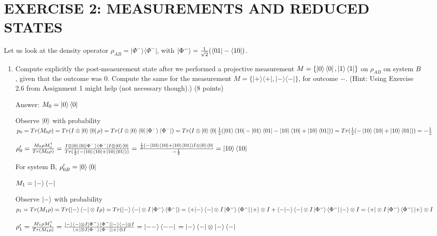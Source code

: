 \documentclass{article}
\begin{document}
\section{EXERCISE 2: MEASUREMENTS AND REDUCED STATES}
Let us look at the density operator $\rho_{AB} = |\Phi^{-}\rangle\langle\Phi^{-}|$, with $|\Phi^{-}\rangle = \frac{1}{\sqrt{2}}(\bra{01} - \bra{10})$.

\begin{enumerate}
    \item Compute explicitly the post-measurement state after we performed a projective measurement $M = \{\ket{0}\bra{0},\ket{1}\bra{1}\}$ on $\rho_{AB}$ on system $B$, given that the outcome was $0$. Compute the same for the measurement $M = \{|+\rangle\langle+|, |-\rangle\langle-|\}$, for outcome $-$. (Hint: Using Exercise 2.6 from Assignment 1 might help (not necessary though).) (8 points)

          Answer: $M_0=\ket{0}\bra{0}$

          Observe $\ket{0}$ with probability $p_0=Tr(M_0\rho)=Tr(I\otimes \ket{0}\bra{0}\rho)=Tr(I\otimes \ket{0}\bra{0}\ket{\Phi^{-}}\bra{\Phi^{-}})=Tr(I\otimes \ket{0}\bra{0}\frac{1}{2}(\ket{01}\bra{10}-\ket{01}\bra{01}-\ket{10}\bra{10}+\ket{10}\bra{01}))=Tr(\frac{1}{2}(-\ket{10}\bra{10}+\ket{10}\bra{01}))=-\frac{1}{2}$

          $\rho_0'=\frac{M_0\rho M_0^{\dagger}}{Tr(M_0\rho)}
              \\=\frac{I\otimes \ket{0}\bra{0}\ket{\Phi^{-}}\bra{\Phi^{-}}I\otimes \ket{0}\bra{0}}{Tr(\frac{1}{2}(-\ket{10}\bra{10}+\ket{10}\bra{01}))}
              \\=\frac{\frac{1}{2}(-\ket{10}\bra{10}+\ket{10}\bra{01})I\otimes \ket{0}\bra{0}}{-\frac{1}{2}}
              \\=\ket{10}\bra{10}
          $

          For system B, $\rho_{0B}'=\ket{0}\bra{0}$


          $M_1=\ket{-}\bra{-}$

          Observe $\ket{-}$ with probability $p_1=Tr(M_1\rho)=Tr(\ket{-}\bra{-}\otimes I\rho)=Tr(\ket{-}\bra{-}\otimes I\ket{\Phi^{-}}\bra{\Phi^{-}})=\braket{+|-}\bra{-}\otimes I\ket{\Phi^-}\bra{\Phi^-}\ket{+}\otimes I+\braket{-|-}\bra{-}\otimes I\ket{\Phi^-}\bra{\Phi^-}\ket{-}\otimes I=\bra{+}\otimes I\ket{\Phi^-}\bra{\Phi^-}\ket{+}\otimes I$

          $\rho_1'=\frac{M_1\rho M_1^{\dagger}}{Tr(M_1\rho)}
              \\=\frac{\ket{-}\bra{-}\otimes I\ket{\Phi^{-}}\bra{\Phi^{-}}\ket{-}\bra{-}\otimes I}{\bra{+}\otimes I\ket{\Phi^-}\bra{\Phi^-}\ket{+}\otimes I}
              \\=\ket{--}\bra{--}
              \\=\ket{-}\bra{-}\otimes\ket{-}\bra{-}
          $


\end{enumerate}
\end{document}
